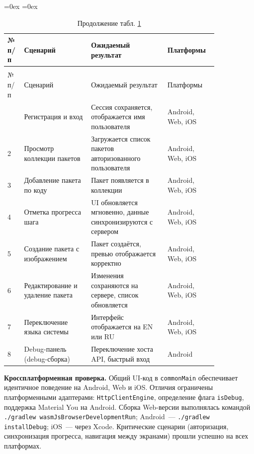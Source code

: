 \documentclass[../main.tex]{subfiles}
\begin{document}
\aboverulesep=0ex
\belowrulesep=0ex
\begin{small}
\begin{longtable}[t]{
	|>{\raggedright}p{0.06\linewidth} |
	>{\raggedright}p{0.28\linewidth} |
	>{\raggedright}p{0.32\linewidth} |
	>{\raggedright\arraybackslash}p{0.18\linewidth}|
}
\caption{Результаты функционального тестирования} \label{tab:func-tests}\\
\midrule
№ п/п & Сценарий & Ожидаемый результат & Платформы \\
\midrule
\endfirsthead
\caption*{Продолжение табл. \ref{tab:func-tests}\raggedleft}\\\midrule
№ п/п & Сценарий & Ожидаемый результат & Платформы \\
\midrule
\endhead
\midrule
\endfoot
\midrule
\endlastfoot
1 & Регистрация и вход & Сессия сохраняется, отображается имя пользователя & Android, Web, iOS \\
\midrule
2 & Просмотр коллекции пакетов & Загружается список пакетов авторизованного пользователя & Android, Web, iOS \\
\midrule
3 & Добавление пакета по коду & Пакет появляется в коллекции & Android, Web, iOS \\
\midrule
4 & Отметка прогресса шага & UI обновляется мгновенно, данные синхронизируются с сервером & Android, Web, iOS \\
\midrule
5 & Создание пакета с изображением & Пакет создаётся, превью отображается корректно & Android, Web, iOS \\
\midrule
6 & Редактирование и удаление пакета & Изменения сохраняются на сервере, список обновляется & Android, Web, iOS \\
\midrule
7 & Переключение языка системы & Интерфейс отображается на EN или RU & Android, Web, iOS \\
\midrule
8 & Debug-панель (debug-сборка) & Переключение хоста API, быстрый вход & Android \\
\end{longtable}
\end{small}

\textbf{Кроссплатформенная проверка.} Общий UI-код в \texttt{commonMain} обеспечивает идентичное поведение на Android, Web и iOS. Отличия ограничены платформенными адаптерами: \texttt{HttpClientEngine}, определение флага \texttt{isDebug}, поддержка Material You на Android. Сборка Web-версии выполнялась командой \texttt{./gradlew wasmJsBrowserDevelopmentRun}; Android~--- \texttt{./gradlew installDebug}; iOS~--- через Xcode. Критические сценарии (авторизация, синхронизация прогресса, навигация между экранами) прошли успешно на всех платформах.
\end{document}
